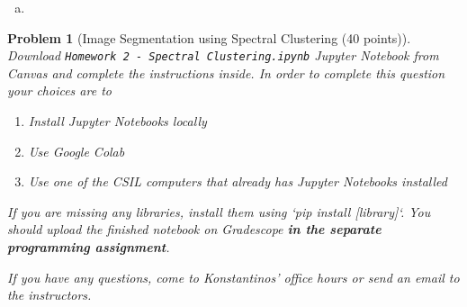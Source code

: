 \documentclass[10pt]{article}
\newcommand{\1}{\vec{\mathbbm{1}}}
\newtheorem{problem}{\sc\color{cit}Problem}
\begin{document}
{\begin{enumerate}[(a)]
\begin{itemize}
    Then dist$(v^*, v) \leq \norm{g(v) - g(v^*)}_1$   Note that the minimum distance on a tree graph is unique, therefore dist$(v^*, v) = \norm{g(v) - g(v^*)}_1$ since the inequality in the first step turns into an equality. Thus under the mapping $g$, $T_{k+1}$ is $\ell_1$ embeddable.
    \end{itemize}
    
    \item
\end{enumerate}
}

\newpage

\begin{problem}[Image Segmentation using Spectral Clustering (40 points)]
Download {\tt Homework 2 - Spectral Clustering.ipynb} Jupyter Notebook from Canvas and complete the instructions inside. In order to complete this question your choices are to
\begin{enumerate}
    \item Install Jupyter Notebooks locally
    \item Use Google Colab
    \item Use one of the CSIL computers that already has Jupyter Notebooks installed
\end{enumerate}

If you are missing any libraries, install them using `pip install [library]`. You should upload the finished notebook on Gradescope {\bf in the separate programming assignment}.

If you have any questions, come to Konstantinos' office hours or send an email to the instructors.

\end{problem}

\newpage
\end{document}
